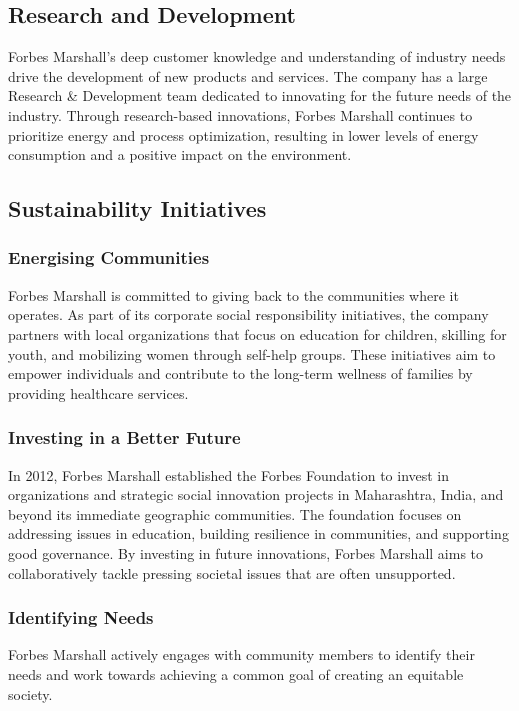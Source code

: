 \subsection{Research and Development}
Forbes Marshall's deep customer knowledge and understanding of industry needs drive the development of new products and services. The company has a large Research \& Development team dedicated to innovating for the future needs of the industry. Through research-based innovations, Forbes Marshall continues to prioritize energy and process optimization, resulting in lower levels of energy consumption and a positive impact on the environment.

\subsection{Sustainability Initiatives}
\subsubsection{Energising Communities}
Forbes Marshall is committed to giving back to the communities where it operates. As part of its corporate social responsibility initiatives, the company partners with local organizations that focus on education for children, skilling for youth, and mobilizing women through self-help groups. These initiatives aim to empower individuals and contribute to the long-term wellness of families by providing healthcare services.

\subsubsection{Investing in a Better Future}
In 2012, Forbes Marshall established the Forbes Foundation to invest in organizations and strategic social innovation projects in Maharashtra, India, and beyond its immediate geographic communities. The foundation focuses on addressing issues in education, building resilience in communities, and supporting good governance. By investing in future innovations, Forbes Marshall aims to collaboratively tackle pressing societal issues that are often unsupported.

\subsubsection{Identifying Needs}
Forbes Marshall actively engages with community members to identify their needs and work towards achieving a common goal of creating an equitable society.

